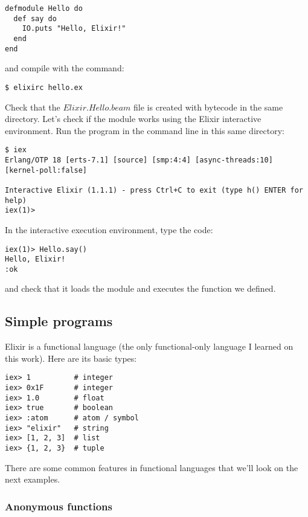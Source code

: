 \begin{lstlisting}[label=emhw,caption=Elixir Hello World inside a module]
defmodule Hello do
  def say do
    IO.puts "Hello, Elixir!"
  end
end
\end{lstlisting}

and compile with the command:

\begin{verbatim}
$ elixirc hello.ex
\end{verbatim}

Check that the $Elixir.Hello.beam$ file is created with bytecode in the same
directory. Let's check if the module works using the Elixir interactive
environment. Run the program in the command line in this same directory:

\begin{verbatim}
$ iex
Erlang/OTP 18 [erts-7.1] [source] [smp:4:4] [async-threads:10] [kernel-poll:false]

Interactive Elixir (1.1.1) - press Ctrl+C to exit (type h() ENTER for help)
iex(1)>
\end{verbatim}

In the interactive execution environment, type the code:

\begin{verbatim}
iex(1)> Hello.say()
Hello, Elixir!
:ok
\end{verbatim}

and check that it loads the module and executes the function we defined.

\subsection{Simple programs}

Elixir is a functional language (the only functional-only language I learned on
this work). Here are its basic types:

\begin{verbatim}
iex> 1          # integer
iex> 0x1F       # integer
iex> 1.0        # float
iex> true       # boolean
iex> :atom      # atom / symbol
iex> "elixir"   # string
iex> [1, 2, 3]  # list
iex> {1, 2, 3}  # tuple
\end{verbatim}

There are some common features in functional languages that we'll
look on the next examples.

\subsubsection{Anonymous functions}


